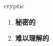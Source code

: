 
\begin{frame}
{\huge cryptic}
\begin{center}
\begin{enumerate}\Large
  \item \textbf{秘密的}
  \item \textbf{难以理解的}
\end{enumerate}
\end{center}
\end{frame}
